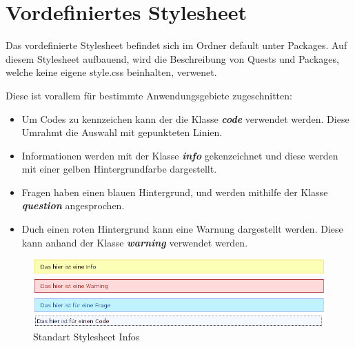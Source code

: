 \section{Vordefiniertes Stylesheet}

Das vordefinierte Stylesheet befindet sich im Ordner default unter Packages. Auf diesem Stylesheet aufbauend, wird die Beschreibung von Quests und Packages, welche keine eigene style.css beinhalten, verwenet.

Diese ist vorallem für bestimmte Anwendungsgebiete zugeschnitten:
\begin{itemize}
\item Um Codes zu kennzeichen kann der die Klasse \textit{\textbf{code}} verwendet werden. Diese Umrahmt die Auswahl mit gepunkteten Linien.
\item Informationen werden mit der Klasse \textit{\textbf{info}} gekenzeichnet und diese werden mit einer gelben Hintergrundfarbe dargestellt.
\item Fragen haben einen blauen Hintergrund, und werden mithilfe der Klasse \textit{\textbf{question}} angesprochen.
\item Duch einen roten Hintergrund kann eine Warnung dargestellt werden. Diese kann anhand der Klasse \textit{\textbf{warning}} verwendet werden.
\end{itemize}

\begin{figure}[h] 
  \centering
     \includegraphics[width=1\textwidth]{./media/images/quest/style.png}
  \caption{Standart Stylesheet Infos}
  \label{fig:defaut_stylesheet}
\end{figure}